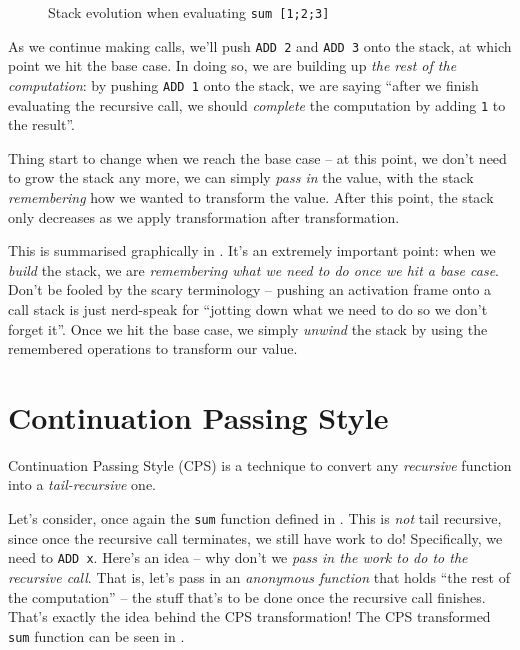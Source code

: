 \begin{figure}[h]
    \centering
    
    \vspace{-10mm}
    \caption{Stack evolution when evaluating 
    \texttt{sum [1;2;3]}}
    \label{fig-sumstack}
\end{figure}

As we continue making calls, we'll push \texttt{ADD 2} and \texttt{ADD 3} onto the stack, at which point we hit the base case. In doing so, we are building up \emph{the rest of the computation}: by pushing \texttt{ADD 1} onto the stack, we are saying ``after we finish evaluating the recursive call, we should \emph{complete} the computation by adding \texttt{1} to the result''.

Thing start to change when we reach the base case -- at this point, we don't need to grow the stack any more, we can simply \emph{pass in} the value, with the stack \emph{remembering} how we wanted to transform the value. After this point, the stack only decreases as we apply transformation after transformation.

This is summarised graphically in . It's an extremely important point: when we \emph{build} the stack, we are \emph{remembering what we need to do once we hit a base case}. Don't be fooled by the scary terminology -- pushing an activation frame onto a call stack is just nerd-speak for ``jotting down what we need to do so we don't forget it''. Once we hit the base case, we simply \emph{unwind} the stack by using the remembered operations to transform our value.

\section{Continuation Passing Style}
Continuation Passing Style (CPS) is a technique to convert any \emph{recursive} function into a \emph{tail-recursive} one. 

Let's consider, once again the \texttt{sum} function defined in . This is \emph{not} tail recursive, since once the recursive call terminates, we still have work to do! Specifically, we need to \texttt{ADD x}. Here's an idea -- why don't we \emph{pass in the work to do to the recursive call}. That is, let's pass in an \emph{anonymous function} that holds ``the rest of the computation'' -- the stuff that's to be done once the recursive call finishes. That's exactly the idea behind the CPS transformation! The CPS transformed \texttt{sum} function can be seen in .

